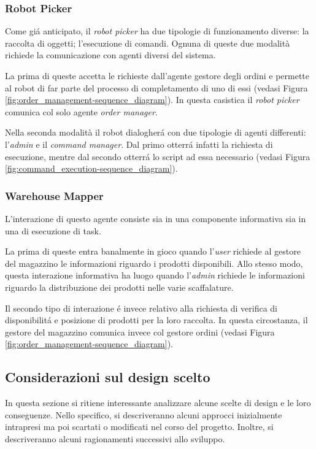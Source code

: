 \subsubsection{Robot Picker}
Come gi\'a anticipato, il \textit{robot picker} ha due tipologie di funzionamento diverse: la raccolta di oggetti; l'esecuzione di comandi. Ognuna di queste due modalità richiede la comunicazione con agenti diversi del sistema.

La prima di queste accetta le richieste dall'agente gestore degli ordini e permette al robot di far parte del processo di completamento di uno di essi (vedasi Figura \ref{fig:order_management-sequence_diagram}). In questa casistica il \textit{robot picker} comunica col solo agente \textit{order manager}.

Nella seconda modalità il robot dialogher\'a con due tipologie di agenti differenti: l'\textit{admin} e il \textit{command manager}. Dal primo otterr\'a infatti la richiesta di esecuzione, mentre dal secondo otterr\'a lo script ad essa necessario (vedasi Figura \ref{fig:command_execution-sequence_diagram}).

\subsubsection{Warehouse Mapper}
L'interazione di questo agente consiste sia in una componente informativa sia in una di esecuzione di task.

La prima di queste entra banalmente in gioco quando l'\textit{user} richiede al gestore del magazzino le informazioni riguardo i prodotti disponibili. Allo stesso modo, questa interazione informativa ha luogo quando l'\textit{admin} richiede le informazioni riguardo la distribuzione dei prodotti nelle varie scaffalature.

Il secondo tipo di interazione \'e invece relativo alla richiesta di verifica di disponibilit\'a e posizione di prodotti per la loro raccolta. In questa circostanza, il gestore del magazzino comunica invece col gestore ordini (vedasi Figura \ref{fig:order_management-sequence_diagram}).

\subsection{Considerazioni sul design scelto}
In questa sezione si ritiene interessante analizzare alcune scelte di design e le loro conseguenze. Nello specifico, si descriveranno alcuni approcci inizialmente intrapresi ma poi scartati o modificati nel corso del progetto. Inoltre, si descriveranno alcuni ragionamenti successivi allo sviluppo.

